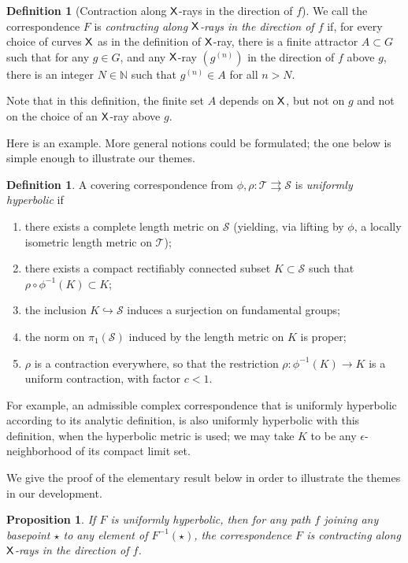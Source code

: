 \documentclass{amsart}
\newcommand\N{{\mathbb{N}}}
\newtheorem{prop}[thm]{Proposition}
\theoremstyle{definition}
\newtheorem{defn}[thm]{Definition}
\theoremstyle{remark}
\newcommand{\sfX}{{\sf X}}
\newcommand{\cT}{\mathcal{T}}
\newcommand{\cS}{\mathcal{S}}
\begin{document}
\begin{defn}[Contraction along $\sfX$-rays in the direction of $f$]\label{defn:bxr}
  We call the correspondence $F$ is \emph{contracting along $\sfX$-rays in the direction of $f$} if, for every choice of curves $\sfX$ as in the definition of $\sfX$-ray, there is a finite attractor $A\subset G$ such that for any $g\in G$, and any $\sfX$-ray $(g^{(n)})$ in the direction of $f$ above $g$, there is an integer $N\in \N$ such that $g^{(n)}\in A$ for all $n>N$.
\end{defn}

Note that in this definition, the finite set $A$ depends on $\sfX$, but not on $g$ and not on the choice of an $\sfX$-ray above $g$.  

Here is an example. More general notions could be formulated; the one below is simple enough to illustrate our themes.

\begin{defn}\label{defn:uniformly hyperbolic}
A covering correspondence from $\phi, \rho\colon \cT \rightrightarrows\cS$ is \emph{uniformly hyperbolic} if 
\begin{enumerate}
\item there exists a complete length metric on $\cS$ (yielding, via lifting by $\phi$, a locally isometric length metric on $\cT$);
\item there exists a compact rectifiably connected subset $K \subset \cS$ such that $\rho\circ\phi^{-1}(K) \subset K$;
\item the inclusion $K \hookrightarrow \cS$ induces a surjection on fundamental groups;
\item the norm on $\pi_1(\cS)$ induced by the length metric on $K$ is proper;
\item $\rho$ is a contraction everywhere, so that the restriction $\rho\colon \phi^{-1}(K)\to K$ is a uniform contraction, with factor $c<1$.
\end{enumerate}
\end{defn}
For example, an admissible complex correspondence that is uniformly hyperbolic according to its analytic definition, is also uniformly hyperbolic with this definition, when the hyperbolic metric is used; we may take $K$ to be any $\epsilon$-neighborhood of its compact limit set.

We give the proof of the elementary result below in order to illustrate the themes in our development.

\begin{prop}\label{prop:uh}
  If $F$ is uniformly hyperbolic, then for any  path $f$ joining any basepoint $\star$ to any element of $F^{-1}(\star)$, the correspondence $F$ is contracting along $\sfX$-rays in the direction of $f$.
\end{prop}
\end{document}
